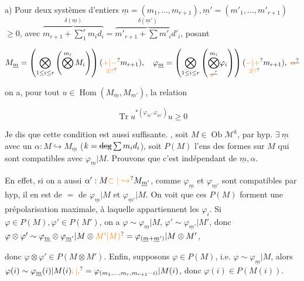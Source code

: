 a) Pour deux systèmes d'entiers $\underline m=(m_1,\ldots,m_{r+1}),\underline m'=(m'_1,\ldots,m'_{r+1})$ $\geq0$, avec $\overbrace{m_{r+1}+\sum_1^r m_i d_i}^{\delta(\underline m)}=\overbrace{m'_{r+1}+\sum m'_i d'_i}^{\delta(\underline m')}$, posant

\[
M_{\underline m}=\left(\bigotimes_{1\leq i\leq r}\left(\bigotimes^{m_i} M_i\right)\right)(\underset{\unsure{2|?}}{\unsure{+|-}}m_{r+1}),\quad
\varphi_{\underline m}=\left(\bigotimes_{1\leq i\leq r}\left(\underset{\deleted{\unsure{\varphi}}}{\bigotimes^{m_i}}\varphi_i\right)\right)(\underset{\unsure{2|?}}{\unsure{-|+}}m_{r+1}),\ \deleted{\unsure{\alpha}}
\]

on a, pour tout $u\in\operatorname{Hom}(M_{\underline m},M_{\underline m'})$, la relation

\[
\operatorname{Tr}u^{*(\varphi_{\underline m},\varphi_{\underline m'})}u\geq0
\]

Je dis que cette condition est aussi suffisante.   , soit $M\in\operatorname{Ob}\mathcal M^k$,  par hyp. $\exists\ \underline m$ avec un $\alpha:M\hookrightarrow M_{\underline m}$ ($k=\deleted{\text{deg}}\sum m_i d_i$), soit $P(M)$ l'ens des formes  sur $M$ qui sont compatibles avec $\varphi_{\underline m}|M$. Prouvons que c'est indépendant de $\underline m,\alpha$.

En effet, si on a aussi $\alpha':M\unsure{\subset|\hookrightarrow}M_{\underline m'}$, comme $\varphi_{\underline m}$ et $\varphi_{\underline m'}$ sont compatibles par hyp, il en est de $=$ de $\varphi_{\underline m}|M$ et $\varphi_{\underline m'}|M$. On voit que ces $P(M)$ forment une prépolarisation maximale,  à laquelle appartiennent  les $\varphi_i$. Si $\varphi\in P(M),\varphi'\in P(M')$,  on a $\varphi\sim\varphi_{\underline m}|M$, $\varphi'\sim\varphi_{\underline m'}|M'$, donc $\varphi\otimes\varphi'\sim\varphi_{\underline m}\otimes\varphi_{\underline m'}|M\otimes\unsure{M'|M)}=\varphi_{(\underline m+\underline m')}|M\otimes M'$, 


donc $\varphi\otimes\varphi'\in P(M\otimes M')$. Enfin, supposons $\varphi\in P(M)$, i.e. $\varphi\sim\varphi_{\underline m}|M$, alors $\varphi(i)\sim\varphi_{\underline m}(i)|M(i)\unsure{;|,}=\varphi_{(m_1,\ldots,m_r,m_{r+1}-i)}|M(i)$, donc $\varphi(i)\in P(M(i))$.


